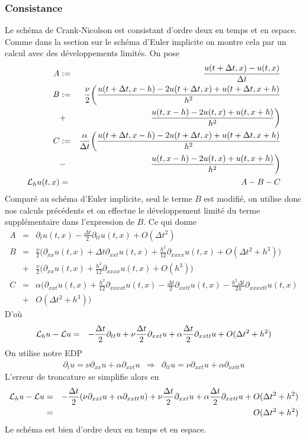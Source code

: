 \subsubsection{Consistance}
Le schéma de Crank-Nicolson est consistant d'ordre deux en temps et en espace. Comme dans la section sur le schéma d'Euler implicite on montre cela par un calcul avec des développements limités. On pose
\begin{eqnarray*}
    A &:=& \frac{u(t+\Delta t,x)-u(t,x)}{\Delta t} \\
    B &:=& \frac{\nu}{2}\bigg(\frac{u(t+\Delta t,x-h)-2u(t+\Delta t, x)+ u(t+\Delta t, x+h)}{h^2} \\
    &+& \frac{u(t,x-h)-2u(t, x) + u(t, x+h)}{h^2}\bigg) \\
    C &:=&\frac{\alpha}{\Delta t}\bigg(\frac{u(t+\Delta t,x-h)-2u(t+\Delta t, x) + u(t+\Delta t, x+h)}{h^2} \\
    &-&\frac{u(t,x-h)-2u(t, x)+u(t, x+h)}{h^2}\bigg) \\
    \mathcal{L}_hu(t,x) &=& A - B - C 
\end{eqnarray*}
Comparé au schéma d'Euler implicite, seul le terme $B$ est modifié, on utilise donc nos calculs précédents et on effectue le développement limité du terme supplémentaire dans l'expression de $B$. Ce qui donne
\begin{eqnarray*}
    A &=& \partial_{t}u(t,x) - \frac{\Delta t}{2} \partial_{tt}u(t,x) + O(\Delta t^2) \\
    B &=&  \frac{\nu}{2} \Big(\partial_{xx}u(t,x) + \Delta t \partial_{xxt}u(t,x) + \frac{h^2}{12} \partial_{xxxx}u(t,x) + O(\Delta t^2+h^3)\Big) \\
    &+& \frac{\nu}{2} \Big(\partial_{xx}u(t,x) + \frac{h^2}{12} \partial_{xxxx}u(t,x) + O(h^3)\Big) \\
    C &=& \alpha\Big(\partial_{xxt}u(t,x) + \frac{h^2}{12}\partial_{xxxxt}u(t,x) - \frac{\Delta t}{2}\partial_{xxtt}u(t,x) - \frac{h^2\Delta t}{24}\partial_{xxxxtt}u(t,x) \\
    &+& O(\Delta t^2 + h^3)\Big)   
\end{eqnarray*}
D'où 
\begin{eqnarray*}
    \mathcal{L}_hu -\mathcal{L} u &=& -\frac{\Delta t}{2}\partial_{tt}u + \nu\frac{\Delta t }{2} \partial_{xxt}u+ \alpha\frac{\Delta t }{2} \partial_{xxtt}u  + O(\Delta t^2 + h^2)
\end{eqnarray*}
On utilise notre EDP
\begin{eqnarray*}
    \partial_tu = \nu \partial_{xx}u + \alpha \partial_{xxt}u 
    & \Longrightarrow& 
    \partial_{tt}u = \nu \partial_{xxt}u + \alpha \partial_{xxtt}u
\end{eqnarray*}
L'erreur de troncature se simplifie alors en
\begin{eqnarray*}
    \mathcal{L}_hu -\mathcal{L} u &=& -\frac{\Delta t}{2}(\nu \partial_{xxt}u + \alpha \partial_{xxtt}u) + \nu\frac{\Delta t }{2} \partial_{xxt}u+ \alpha\frac{\Delta t }{2} \partial_{xxtt}u  + O(\Delta t^2 + h^2) \\
    &=& O(\Delta t^2 + h^2)
\end{eqnarray*}
Le schéma est bien d'ordre deux en temps et en espace.

